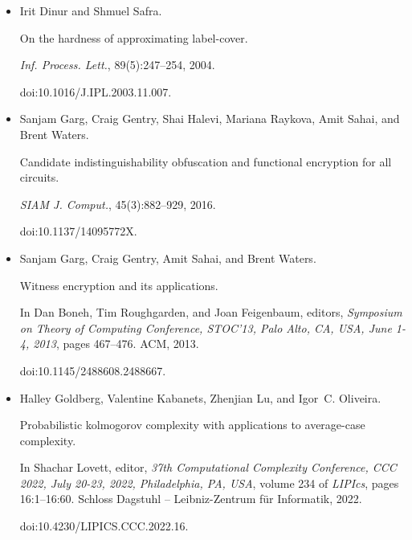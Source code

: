 \begin{itemize}
doi:10.1145/2746539.2746630.





\item[] 
[9]

Irit Dinur and Shmuel Safra.


On the hardness of approximating label-cover.


\emph{Inf. Process. Lett.}, 89(5):247–254, 2004.


doi:10.1016/J.IPL.2003.11.007.





\item[] 
[10]

Sanjam Garg, Craig Gentry, Shai Halevi, Mariana Raykova, Amit Sahai, and Brent
Waters.


Candidate indistinguishability obfuscation and functional encryption
for all circuits.


\emph{SIAM J. Comput.}, 45(3):882–929, 2016.


doi:10.1137/14095772X.





\item[] 
[11]

Sanjam Garg, Craig Gentry, Amit Sahai, and Brent Waters.


Witness encryption and its applications.


In Dan Boneh, Tim Roughgarden, and Joan Feigenbaum, editors, \emph{Symposium on Theory of Computing Conference, STOC’13, Palo Alto, CA, USA,
June 1-4, 2013}, pages 467–476. ACM, 2013.


doi:10.1145/2488608.2488667.





\item[] 
[12]

Halley Goldberg, Valentine Kabanets, Zhenjian Lu, and Igor C. Oliveira.


Probabilistic kolmogorov complexity with applications to average-case
complexity.


In Shachar Lovett, editor, \emph{37th Computational Complexity
Conference, CCC 2022, July 20-23, 2022, Philadelphia, PA, USA}, volume
234 of \emph{LIPIcs}, pages 16:1–16:60. Schloss Dagstuhl – Leibniz-Zentrum
für Informatik, 2022.


doi:10.4230/LIPICS.CCC.2022.16.






\end{itemize}
